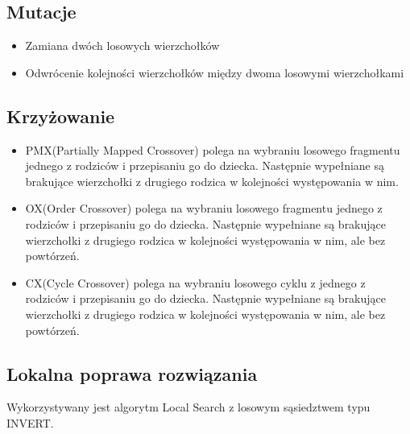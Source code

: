 \documentclass{article}
\begin{document}
\subsection{Mutacje}
\begin{itemize}
    \item Zamiana dwóch losowych wierzchołków
    \item Odwrócenie kolejności wierzchołków między dwoma losowymi wierzchołkami
\end{itemize}

\subsection{Krzyżowanie}
\begin{itemize}
    \item PMX(Partially Mapped Crossover) polega na wybraniu losowego fragmentu jednego z rodziców i przepisaniu go do dziecka. Następnie wypełniane są brakujące wierzchołki z drugiego rodzica w kolejności występowania w nim.
    \item OX(Order Crossover) polega na wybraniu losowego fragmentu jednego z rodziców i przepisaniu go do dziecka. Następnie wypełniane są brakujące wierzchołki z drugiego rodzica w kolejności występowania w nim, ale bez powtórzeń.
    \item CX(Cycle Crossover) polega na wybraniu losowego cyklu z jednego z rodziców i przepisaniu go do dziecka. Następnie wypełniane są brakujące wierzchołki z drugiego rodzica w kolejności występowania w nim, ale bez powtórzeń.
\end{itemize}

\subsection{Lokalna poprawa rozwiązania}
Wykorzystywany jest algorytm Local Search z losowym sąsiedztwem typu INVERT.

\newpage
\end{document}
